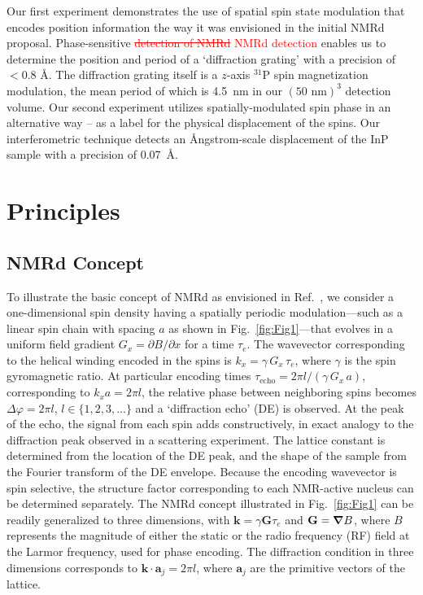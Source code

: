 \documentclass[9pt,twocolumn,twoside,lineno]{pnas-new}
\newcommand{\RB}[3][{}]{\textcolor{red}{\sout{#2} #3\ul{#1}}}
\begin{document}
Our first experiment demonstrates the use of spatial spin state modulation that encodes position information the way it was envisioned in the initial NMRd proposal.
Phase-sensitive \RB{detection of NMRd}{NMRd detection} enables us to determine the position and period of a `diffraction grating' with a precision of $< 0.8 $ \AA.
The diffraction grating itself is a $z$-axis ${}^{31}$P spin magnetization modulation, the mean period of which is 4.5~nm in our $(50 \text{ nm})^3$ detection volume.
Our second experiment utilizes spatially-modulated spin phase in an alternative way -- as a label for the physical displacement of the spins.
Our interferometric technique detects an \AA ngstrom-scale displacement of the InP sample with a precision of 0.07~\AA.

\section*{Principles}
\subsection*{NMR\MakeLowercase{d} Concept}
To illustrate the basic concept of NMRd as envisioned in Ref.~\cite{Mansfield1973}, we consider a one-dimensional spin density having a spatially periodic modulation---such as a linear spin chain with spacing $a$ as shown in Fig.~\ref{fig:Fig1}---that evolves in a uniform field gradient $G_x=\partial B/\partial x$ for a time $\tau_e$.
The wavevector corresponding to the helical winding encoded in the spins is $k_x=\gamma\,G_x\,\tau_e$, where $\gamma$ is the spin gyromagnetic ratio.
At particular encoding times $\tau_{\text{echo}}=2\pi l/(\gamma\,G_x\,a)$, corresponding to $k_x a=2\pi l$, the relative phase between neighboring spins becomes $\Delta\varphi=2\pi l$, $l\in\{1,2,3,\dots\}$ and a `diffraction echo' (DE) is observed.
At the peak of the echo, the signal from each spin adds constructively, in exact analogy to the diffraction peak observed in a scattering experiment. The lattice constant is determined from the location of the DE peak, and the shape of the sample from the Fourier transform of the DE envelope. Because the encoding wavevector is spin selective, the structure factor corresponding to each NMR-active nucleus can be determined separately.
The NMRd concept illustrated in Fig.~\ref{fig:Fig1} can be readily generalized to three dimensions, with $\mathbf{k}=\gamma\mathbf{G}\tau_e$ and $\mathbf{G}=\grad B$, where $B$ represents the magnitude of either the static or the radio frequency (RF) field at the Larmor frequency, used for phase encoding.
The diffraction condition in three dimensions corresponds to $\mathbf{k}\cdot \mathbf{a}_j = 2\pi l$, where $\mathbf{a}_j$ are the primitive vectors of the lattice.
\end{document}
